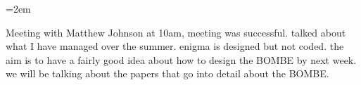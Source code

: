 \documentclass{scrartcl}
\newcommand{\Description}[1]{\hangindent=2em\hangafter=0\noindent\raggedright
\footnotesize{#1}\par\normalsize\vspace{1em}}
\begin{document}
\thispagestyle{empty} %








\begin{cv}{}\vspace{1em} %



\noindent{}\vspace{1em} %



\Description{Meeting with Matthew Johnson at 10am, meeting was successful. talked about what I have managed over the summer. enigma is designed but not coded. the aim is to have a fairly good idea about how to design the BOMBE by next week. we will be talking about the papers that go into detail about the BOMBE.}\vspace{1em} %



\end{cv}
\end{document}
